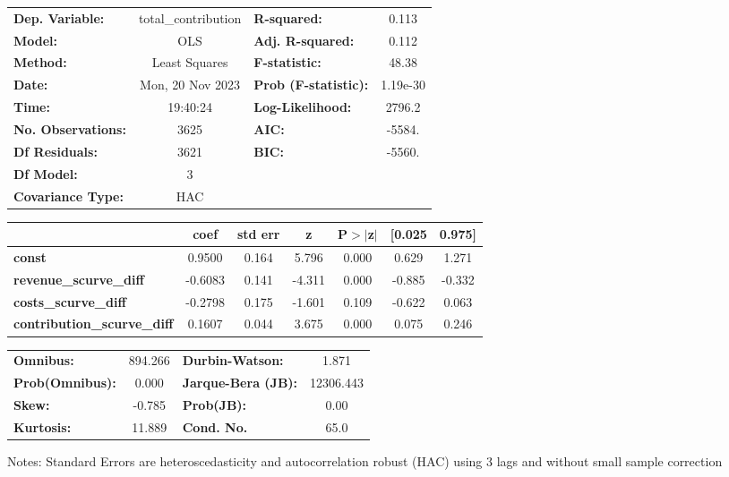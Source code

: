 \begin{center}
\begin{tabular}{lclc}
\toprule
\textbf{Dep. Variable:}             & total\_contribution & \textbf{  R-squared:         } &     0.113   \\
\textbf{Model:}                     &         OLS         & \textbf{  Adj. R-squared:    } &     0.112   \\
\textbf{Method:}                    &    Least Squares    & \textbf{  F-statistic:       } &     48.38   \\
\textbf{Date:}                      &   Mon, 20 Nov 2023  & \textbf{  Prob (F-statistic):} &  1.19e-30   \\
\textbf{Time:}                      &       19:40:24      & \textbf{  Log-Likelihood:    } &    2796.2   \\
\textbf{No. Observations:}          &          3625       & \textbf{  AIC:               } &    -5584.   \\
\textbf{Df Residuals:}              &          3621       & \textbf{  BIC:               } &    -5560.   \\
\textbf{Df Model:}                  &             3       & \textbf{                     } &             \\
\textbf{Covariance Type:}           &         HAC         & \textbf{                     } &             \\
\bottomrule
\end{tabular}
\begin{tabular}{lcccccc}
                                    & \textbf{coef} & \textbf{std err} & \textbf{z} & \textbf{P$> |$z$|$} & \textbf{[0.025} & \textbf{0.975]}  \\
\midrule
\textbf{const}                      &       0.9500  &        0.164     &     5.796  &         0.000        &        0.629    &        1.271     \\
\textbf{revenue\_scurve\_diff}      &      -0.6083  &        0.141     &    -4.311  &         0.000        &       -0.885    &       -0.332     \\
\textbf{costs\_scurve\_diff}        &      -0.2798  &        0.175     &    -1.601  &         0.109        &       -0.622    &        0.063     \\
\textbf{contribution\_scurve\_diff} &       0.1607  &        0.044     &     3.675  &         0.000        &        0.075    &        0.246     \\
\bottomrule
\end{tabular}
\begin{tabular}{lclc}
\textbf{Omnibus:}       & 894.266 & \textbf{  Durbin-Watson:     } &     1.871  \\
\textbf{Prob(Omnibus):} &   0.000 & \textbf{  Jarque-Bera (JB):  } & 12306.443  \\
\textbf{Skew:}          &  -0.785 & \textbf{  Prob(JB):          } &      0.00  \\
\textbf{Kurtosis:}      &  11.889 & \textbf{  Cond. No.          } &      65.0  \\
\bottomrule
\end{tabular}
\end{center}

Notes: \newline
 [1] Standard Errors are heteroscedasticity and autocorrelation robust (HAC) using 3 lags and without small sample correction
